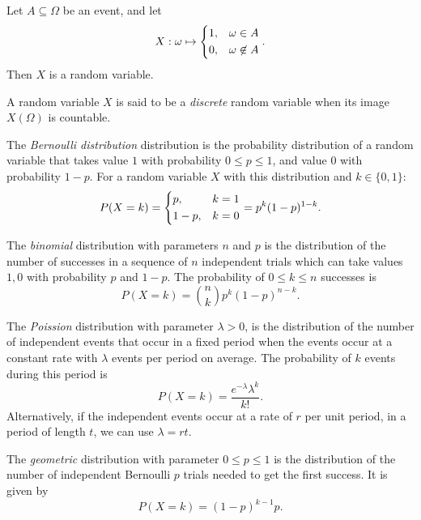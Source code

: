 \begin{exmp}
    Let $A \subseteq \Omega$ be an event, and let
    \[X: \omega \mapsto \begin{dcases}
        1, & \omega \in A \\
        0, & \omega \not\in A
    \end{dcases}.\]
    Then $X$ is a random variable.
\end{exmp}

\begin{defn}
    A random variable $X$ is said to be a \emph{discrete} random variable when its image $X(\Omega)$ is countable.
\end{defn}

\begin{defn}
    The \emph{Bernoulli distribution} distribution is the probability distribution of a random variable that takes value $1$ with probability $0 \leq p \leq 1$, and value $0$ with probability $1 - p$. For a random variable $X$ with this distribution and $k \in \{0, 1\}$:
    \[P(X = k) = \begin{dcases}
        p, & k = 1  \\
        1 - p, & k = 0
    \end{dcases} = p^k(1-p)^{1-k}.\]
\end{defn}

\begin{defn}
    The \emph{binomial} distribution with parameters $n$ and $p$ is the distribution of the number of successes in a sequence of $n$ independent trials which can take values $1, 0$ with probability $p$ and $1 - p$. The probability of $ 0 \leq k \leq n$ successes is
    \[P(X = k) = \binom{n}{k}p^k(1 - p)^{n-k}.\]
\end{defn}

\begin{defn}
    The \emph{Poission} distribution with parameter $\lambda > 0$, is the distribution of the number of independent events that occur in a fixed period when the events occur at a constant rate with $\lambda$ events per period on average. The probability of $k$ events during this period is
    \[P(X = k) = \frac{e^{-\lambda}\lambda^k}{k!}.\]
    Alternatively, if the independent events occur at a rate of $r$ per unit period, in a period of length $t$, we can use $\lambda = rt$.
\end{defn}

\begin{defn}
    The \emph{geometric} distribution with parameter $0 \leq p \leq 1$ is the distribution of the number of independent Bernoulli $p$ trials needed to get the first success. It is given by
    \[P(X = k) = (1-p)^{k-1}p.\]
\end{defn}

